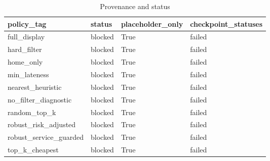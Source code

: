 \begin{table}[ht]
\centering
\begin{tabular}{llll}
 \hline
policy\_tag & status & placeholder\_only & checkpoint\_statuses \\
 \hline
full\_display & blocked & True & failed \\
hard\_filter & blocked & True & failed \\
home\_only & blocked & True & failed \\
min\_lateness & blocked & True & failed \\
nearest\_heuristic & blocked & True & failed \\
no\_filter\_diagnostic & blocked & True & failed \\
random\_top\_k & blocked & True & failed \\
robust\_risk\_adjusted & blocked & True & failed \\
robust\_service\_guarded & blocked & True & failed \\
top\_k\_cheapest & blocked & True & failed \\
 \hline
\end{tabular}
\caption{Provenance and status}
\end{table}
